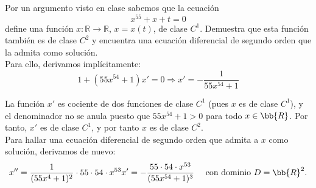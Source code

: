 \documentclass[12pt]{article}
\begin{document}
    \begin{ejercicio}
        Por un argumento visto en clase sabemos que la ecuación
        \begin{equation*}
            x^{55} + x + t = 0
        \end{equation*}
        define una función $x : \mathbb{R} \to \mathbb{R}$, $x = x(t)$, de clase $C^1$. Demuestra que esta función también es de clase $C^2$ y encuentra una ecuación diferencial de segundo orden que la admita como solución.\\

        Para ello, derivamos implícitamente:
        \begin{equation*}
            1+\left(55x^{54}+1\right)x' = 0 \Longrightarrow x' = -\dfrac{1}{55x^{54}+1}
        \end{equation*}

        La función $x'$ es cociente de dos funciones de clase $C^1$ (pues $x$ es de clase $C^1$), y el denominador no se anula puesto que $55x^{54}+1>0$ para todo $x\in \bb{R}$. Por tanto, $x'$ es de clase $C^1$, y por tanto $x$ es de clase $C^2$.\\

        Para hallar una ecuación diferencial de segundo orden que admita a $x$ como solución, derivamos de nuevo:
        \begin{equation*}
            x'' = \dfrac{1}{(55x^4+1)^2}\cdot 55\cdot 54\cdot x^{53}x' = -\dfrac{55\cdot 54\cdot x^{53}}{(55x^{54}+1)^3}
            \quad \text{ con dominio } D = \bb{R}^2.
        \end{equation*}
    \end{ejercicio}
\end{document}
